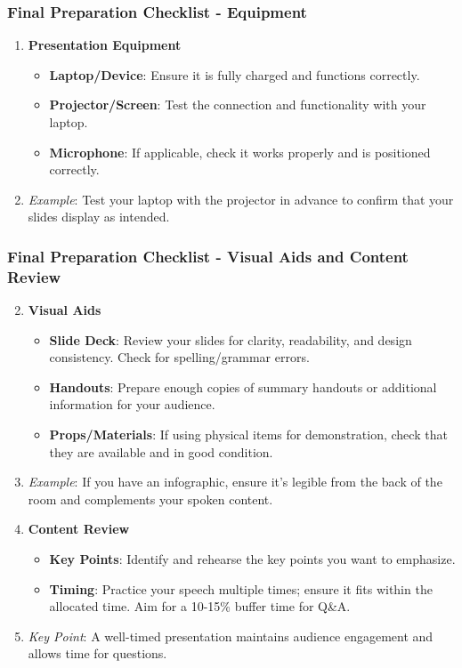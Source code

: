 \documentclass[aspectratio=169]{beamer}
\begin{document}
\begin{frame}[fragile]
    \frametitle{Final Preparation Checklist - Equipment}
    \begin{enumerate}
        \item \textbf{Presentation Equipment}
        \begin{itemize}
            \item \textbf{Laptop/Device}: Ensure it is fully charged and functions correctly.
            \item \textbf{Projector/Screen}: Test the connection and functionality with your laptop.
            \item \textbf{Microphone}: If applicable, check it works properly and is positioned correctly.
        \end{itemize}
        \item \textit{Example}: Test your laptop with the projector in advance to confirm that your slides display as intended.
    \end{enumerate}
\end{frame}

\begin{frame}[fragile]
    \frametitle{Final Preparation Checklist - Visual Aids and Content Review}
    \begin{enumerate}
        \setcounter{enumi}{1} %
        \item \textbf{Visual Aids}
        \begin{itemize}
            \item \textbf{Slide Deck}: Review your slides for clarity, readability, and design consistency. Check for spelling/grammar errors.
            \item \textbf{Handouts}: Prepare enough copies of summary handouts or additional information for your audience.
            \item \textbf{Props/Materials}: If using physical items for demonstration, check that they are available and in good condition.
        \end{itemize}
        \item \textit{Example}: If you have an infographic, ensure it's legible from the back of the room and complements your spoken content.
        
        \item \textbf{Content Review}
        \begin{itemize}
            \item \textbf{Key Points}: Identify and rehearse the key points you want to emphasize.
            \item \textbf{Timing}: Practice your speech multiple times; ensure it fits within the allocated time. Aim for a 10-15\% buffer time for Q\&A.
        \end{itemize}
        \item \textit{Key Point}: A well-timed presentation maintains audience engagement and allows time for questions.
    \end{enumerate}
\end{frame}
\end{document}
